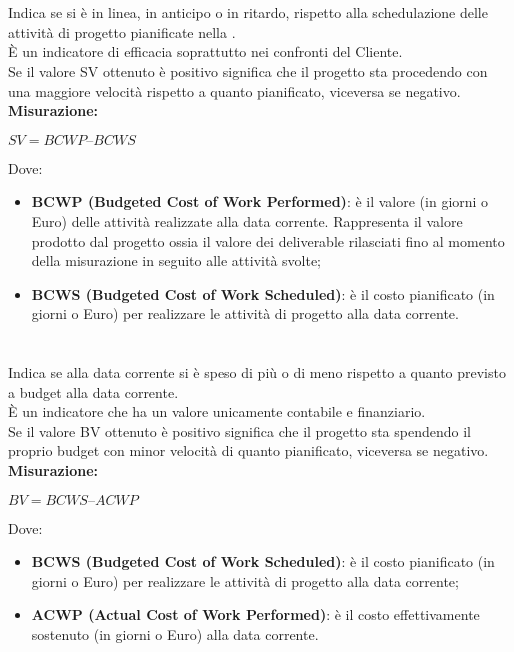 \documentclass[PianoDiQualifica.tex]{subfiles}
\begin{document}
\paragraph{}
\\
Indica se si è in linea, in anticipo o in ritardo, rispetto alla schedulazione delle attività di progetto pianificate nella .\\
È un indicatore di efficacia soprattutto nei confronti del Cliente. \\
Se il valore SV ottenuto è positivo significa che il progetto sta procedendo con una maggiore velocità rispetto a quanto pianificato, viceversa se negativo.\\
\textbf{Misurazione:}
\begin{center}
	 $ SV = BCWP – BCWS $
\end{center}
Dove: \begin{itemize}
	\item \textbf{BCWP (Budgeted Cost of Work Performed)}: è il valore (in giorni o Euro) delle attività realizzate alla data corrente.
	Rappresenta il valore prodotto dal progetto ossia il valore dei deliverable rilasciati fino al momento della misurazione in seguito alle attività svolte;
	\item \textbf{BCWS (Budgeted Cost of Work Scheduled)}: è il costo pianificato (in giorni o Euro) per realizzare le attività di progetto alla data corrente.
\end{itemize}


\paragraph{}
\\
Indica se alla data corrente si è speso di più o di meno rispetto a quanto previsto a budget alla data corrente.\\
È un indicatore che ha un valore unicamente contabile e finanziario.\\
Se il valore BV ottenuto è positivo significa che il progetto sta spendendo il proprio budget con minor velocità di quanto pianificato, viceversa se negativo.\\

\textbf{Misurazione:}
\begin{center}
	$ BV = BCWS – ACWP $
\end{center}
Dove: \begin{itemize}
	\item \textbf{BCWS (Budgeted Cost of Work Scheduled)}: è il costo pianificato (in giorni o Euro) per realizzare le attività di progetto alla data corrente;
	\item \textbf{ACWP (Actual Cost of Work Performed)}: è il costo effettivamente sostenuto (in giorni o Euro) alla data corrente.
\end{itemize}
\end{document}
